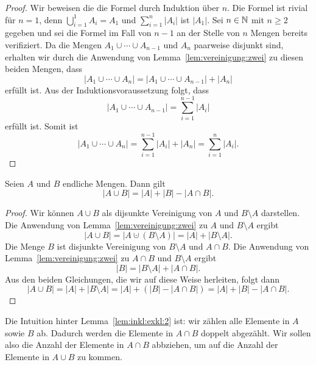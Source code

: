 \begin{proof} 
	Wir beweisen die die Formel durch Induktion über $n$. 
	Die Formel ist rivial für $n=1$, denn $\bigcup_{i=1}^1 A_i = A_1$ und $\sum_{i=1}^n |A_i|$ ist $|A_1|$. 
	Sei $n \in \mathbb{N}$ mit $n \ge 2$ gegeben und sei die Formel im Fall von $n-1$ an der Stelle von $n$ Mengen bereits verifiziert. Da die Mengen $A_1 \cup \cdots \cup A_{n-1}$ und $A_n$ paarweise disjunkt sind, erhalten wir durch die Anwendung von Lemma~\ref{lem:vereinigung:zwei} zu diesen beiden Mengen, dass 
	\[
		| A_1 \cup \cdots \cup A_n| = |A_1 \cup \cdots \cup A_{n-1} | + |A_n| 
	\]
	erfüllt ist. Aus der Induktionsvoraussetzung folgt, dass 
	\[
		| A_1 \cup \cdots \cup A_{n-1} | = \sum_{i=1}^{n-1} |A_i|
	\]
	erfüllt ist. Somit ist 
	\[
		| A_1 \cup \cdots \cup A_n| = \sum_{i=1}^{n-1} |A_i|  + |A_n| = \sum_{i=1}^n |A_i|. 
	\]
\end{proof} 

\begin{lem} \label{lem:inkl:exkl:2}
	Seien $A$ und $B$ endliche Mengen. Dann gilt 
	\[
		|A \cup B| = |A| + |B| - |A \cap B|. 
	\]
\end{lem}

\begin{proof}
		Wir können $A \cup B$ als dijsunkte Vereinigung von $A$ und $B \setminus A$ darstellen. Die Anwendung von Lemma~\ref{lem:vereinigung:zwei} zu $A$ und $B \setminus A$ ergibt 
		\[
			| A \cup B| = |A \cupdot (B \setminus A)| = |A | + |B \setminus A|. 
		\]
		Die Menge $B$ ist disjunkte Vereinigung von $B \setminus A$ und $A \cap B$. Die Anwendung von Lemma~\ref{lem:vereinigung:zwei} zu $A \cap B$ und $B \setminus A$ ergibt
		\[
			|B| = |B \setminus A| + |A \cap B|. 
		\]
		Aus den beiden Gleichungen, die wir auf diese Weise herleiten, folgt dann 
		\[
			| A \cup B|  = |A | + |B \setminus A| = |A| + (|B| - | A \cap B|) = |A| + |B| - | A \cap B|. 
		\]
\end{proof} 

\begin{bem}
	Die Intuition hinter Lemma~\ref{lem:inkl:exkl:2} ist: wir zählen alle Elemente in $A$ sowie $B$ ab. Dadurch werden die Elemente in $A \cap B$ doppelt abgezählt. Wir sollen also die Anzahl der Elemente in $A \cap B$ abbziehen, um auf die Anzahl der Elemente in $A \cup B$ zu kommen. 
\end{bem} 

